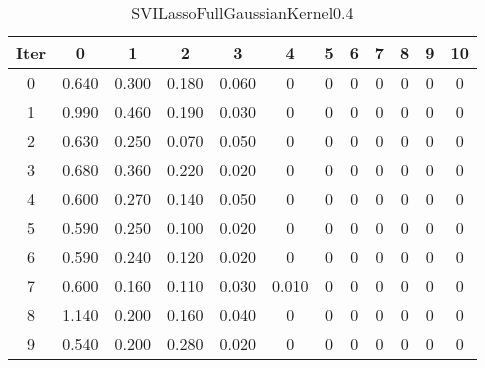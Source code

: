 \begin{table}
	\begin{center}
		\begin{tabular}{|c|c|c|c|c|c|c|c|c|c|c|c|}
			\hline
			Iter & 0 & 1 & 2 & 3 & 4 & 5 & 6 & 7 & 8 & 9 & 10 \\
			\hline
			0 & 0.640 & 0.300 & 0.180 & 0.060 & 0 & 0 & 0 & 0 & 0 & 0 & 0 \\
			\hline
			1 & 0.990 & 0.460 & 0.190 & 0.030 & 0 & 0 & 0 & 0 & 0 & 0 & 0 \\
			\hline
			2 & 0.630 & 0.250 & 0.070 & 0.050 & 0 & 0 & 0 & 0 & 0 & 0 & 0 \\
			\hline
			3 & 0.680 & 0.360 & 0.220 & 0.020 & 0 & 0 & 0 & 0 & 0 & 0 & 0 \\
			\hline
			4 & 0.600 & 0.270 & 0.140 & 0.050 & 0 & 0 & 0 & 0 & 0 & 0 & 0 \\
			\hline
			5 & 0.590 & 0.250 & 0.100 & 0.020 & 0 & 0 & 0 & 0 & 0 & 0 & 0 \\
			\hline
			6 & 0.590 & 0.240 & 0.120 & 0.020 & 0 & 0 & 0 & 0 & 0 & 0 & 0 \\
			\hline
			7 & 0.600 & 0.160 & 0.110 & 0.030 & 0.010 & 0 & 0 & 0 & 0 & 0 & 0 \\
			\hline
			8 & 1.140 & 0.200 & 0.160 & 0.040 & 0 & 0 & 0 & 0 & 0 & 0 & 0 \\
			\hline
			9 & 0.540 & 0.200 & 0.280 & 0.020 & 0 & 0 & 0 & 0 & 0 & 0 & 0 \\
			\hline
		\end{tabular}
	\end{center}
	\caption{SVILassoFullGaussianKernel0.4}
\end{table}